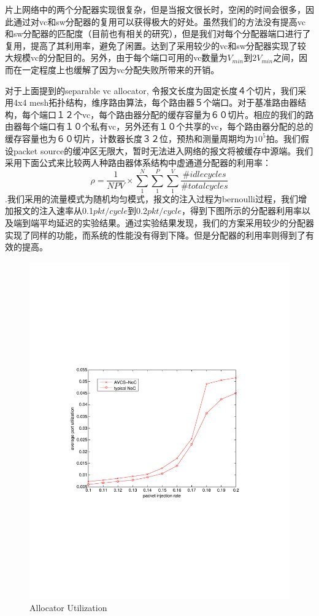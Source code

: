 ﻿\documentclass[10pt,journal]{IEEEtran}
\begin{document}
片上网络中的两个分配器实现很复杂，但是当报文很长时，空闲的时间会很多，因此通过对vc和sw分配器的复用可以获得极大的好处。虽然我们的方法没有提高vc和sw分配器的匹配度（目前也有相关的研究），但是我们对每个分配器端口进行了复用，提高了其利用率，避免了闲置。达到了采用较少的vc和sw分配器实现了较大规模vc的分配目的。另外，由于每个端口可用的vc数量为$V_{min}$到$2V_{min}$之间，因而在一定程度上也缓解了因为vc分配失败所带来的开销。

对于上面提到的separable vc allocator, 令报文长度为固定长度４个切片，我们采用4x4 mesh拓扑结构，维序路由算法，每个路由器５个端口。对于基准路由器结构，每个端口１２个vc，每个路由器分配的缓存容量为６０切片。相应的我们的路由器每个端口有１０个私有vc，另外还有１０个共享的vc，每个路由器分配的总的缓存容量也为６０切片，计数器长度３２位，预热和测量周期均为$10^5$拍。我们假设packet source的缓冲区无限大，暂时无法进入网络的报文将被缓存中源端。我们采用下面公式来比较两人种路由器体系结构中虚通道分配器的利用率：$$\rho=\frac{1}{NPV}\times \sum_1^N\sum_1^P\sum_1^V\frac{\#idlecycles}{\#totalcycles}$$.我们采用的流量模式为随机均匀模式，报文的注入过程为bernoulli过程，我们增加报文的注入速率从0.1$pkt/cycle$到0.2$pkt/cycle$，得到下图所示的分配器利用率以及端到端平均延迟的实验结果。通过实验结果发现，我们的方案采用较少的分配器实现了同样的功能，而系统的性能没有得到下降。但是分配器的利用率则得到了有效的提高。
\begin{figure}
\centering\includegraphics[scale=0.5]{figures/allocator.pdf}
\caption{Allocator Utilization}\label{allocator}
\end{figure}
\end{document}
